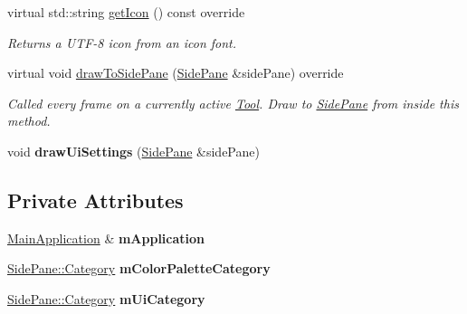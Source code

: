 \begin{DoxyCompactItemize}
virtual std\+::string \mbox{\hyperlink{classpepr3d_1_1_settings_ab8db98e9aababb2f7a896d000bfd5069}{get\+Icon}} () const override
\begin{DoxyCompactList}\small\item\em Returns a U\+T\+F-\/8 icon from an icon font. \end{DoxyCompactList}\item 
\mbox{\label{classpepr3d_1_1_settings_a69cb0d00220487d9b5d1b3b8844db0a0}} 
virtual void \mbox{\hyperlink{classpepr3d_1_1_settings_a69cb0d00220487d9b5d1b3b8844db0a0}{draw\+To\+Side\+Pane}} (\mbox{\hyperlink{classpepr3d_1_1_side_pane}{Side\+Pane}} \&side\+Pane) override
\begin{DoxyCompactList}\small\item\em Called every frame on a currently active \mbox{\hyperlink{classpepr3d_1_1_tool}{Tool}}. Draw to \mbox{\hyperlink{classpepr3d_1_1_side_pane}{Side\+Pane}} from inside this method. \end{DoxyCompactList}\item 
\mbox{\label{classpepr3d_1_1_settings_af1aed4fc1479b60b2cbe20e1d19a79ba}} 
void {\bfseries draw\+Ui\+Settings} (\mbox{\hyperlink{classpepr3d_1_1_side_pane}{Side\+Pane}} \&side\+Pane)
\end{DoxyCompactItemize}
\subsection*{Private Attributes}
\begin{DoxyCompactItemize}
\item 
\mbox{\label{classpepr3d_1_1_settings_a0148b73a88a1d78cd0f3d2cf6e029954}} 
\mbox{\hyperlink{classpepr3d_1_1_main_application}{Main\+Application}} \& {\bfseries m\+Application}
\item 
\mbox{\label{classpepr3d_1_1_settings_ab37151c9365505c083401b05171623e2}} 
\mbox{\hyperlink{classpepr3d_1_1_side_pane_1_1_category}{Side\+Pane\+::\+Category}} {\bfseries m\+Color\+Palette\+Category}
\item 
\mbox{\label{classpepr3d_1_1_settings_a05198990c87d8cfa45a4d26c68aafd0b}} 
\mbox{\hyperlink{classpepr3d_1_1_side_pane_1_1_category}{Side\+Pane\+::\+Category}} {\bfseries m\+Ui\+Category}
\end{DoxyCompactItemize}


